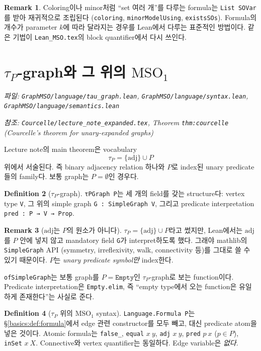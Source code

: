 \documentclass[11pt]{article}
\theoremstyle{definition}
\newtheorem{definition}{Definition}[section]
\newtheorem{remark}[definition]{Remark}
\theoremstyle{plain}
\newcommand{\MSOone}{\mathrm{MSO}_1}
\newcommand{\lean}[1]{\texttt{#1}}
\newcommand{\leanfile}[1]{\texttt{#1}}
\begin{document}
\begin{remark}
Coloring이나 minor처럼 ``set 여러 개''를 다루는 formula는 \lean{List SOVar}를
받아 재귀적으로 조립된다 (\lean{coloring}, \lean{minorModelUsing},
\lean{existsSOs}). Formula의 개수가 parameter $k$에 따라 달라지는 경우를
Lean에서 다루는 표준적인 방법이다. 같은 기법이 \leanfile{Lean\_MSO.tex}의
block quantifier에서 다시 쓰인다.
\end{remark}

\section{\texorpdfstring{$\tau_P$}{tau P}-graph와 그 위의 \texorpdfstring{$\MSOone$}{MSO1}}
\label{basics:sec:taump}

\emph{파일: \leanfile{GraphMSO/language/tau\_graph.lean},
\leanfile{GraphMSO/language/syntax.lean},
\leanfile{GraphMSO/language/semantics.lean}}

\emph{참조: \leanfile{Courcelle/lecture\_note\_expanded.tex}, Theorem
\lean{thm:courcelle} (Courcelle's theorem for unary-expanded graphs)}

Lecture note의 main theorem은 vocabulary
\[
  \tau_P = \{\mathrm{adj}\} \cup P
\]
위에서 서술된다. 즉 binary adjacency relation 하나와 $P$로 index된 unary
predicate들의 family다. 보통 graph는 $P = \emptyset$인 경우다.

\begin{definition}[$\tau_P$-graph]
\label{basics:def:taupgraph}
\lean{τPGraph P}는 세 개의 field를 갖는 structure다:
vertex type \lean{V}, 그 위의 simple graph \lean{G : SimpleGraph V},
그리고 predicate interpretation \lean{pred : P → V → Prop}.
\end{definition}

\begin{remark}[$\mathrm{adj}$는 $P$의 원소가 아니다]
$\tau_P = \{\mathrm{adj}\} \cup P$라고 썼지만, Lean에서는 $\mathrm{adj}$를
$P$ 안에 넣지 않고 mandatory field \lean{G}가 interpret하도록 했다. 그래야
mathlib의 \lean{SimpleGraph} API (symmetry, irreflexivity, walk, connectivity
등)를 그대로 쓸 수 있기 때문이다. $P$는 \emph{unary predicate symbol만}
index한다.
\end{remark}

\lean{ofSimpleGraph}는 보통 graph를 $P = \lean{Empty}$인 $\tau_P$-graph로
보는 function이다. Predicate interpretation은 \lean{Empty.elim}, 즉
``empty type에서 오는 function은 유일하게 존재한다''는 사실로 준다.

\begin{definition}[$\tau_P$ 위의 $\MSOone$ syntax]
\label{basics:def:tauformula}
\lean{Language.Formula P}는 \S\ref{basics:def:formula}에서 edge 관련
constructor를 모두 빼고, 대신 predicate atom을 넣은 것이다. Atomic formula는
\lean{false\_}, \lean{equal} $x\ y$, \lean{adj} $x\ y$,
\lean{pred} $p\ x$ ($p \in P$), \lean{inSet} $x\ X$.
Connective와 vertex quantifier는 동일하다. Edge variable은 \emph{없다}.
\end{definition}
\end{document}
